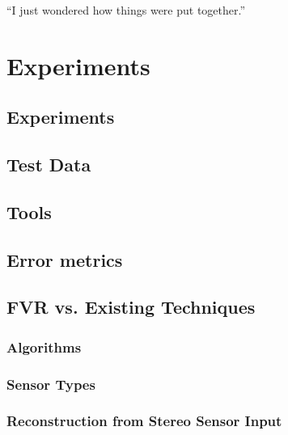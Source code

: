 \begin{savequote}[8cm]
  ``I just wondered how things were put together.''
\end{savequote}
\makeatletter
\chapter{Experiments}
\label{ch:Experiments}

\section{Experiments}



\section{Test Data}
\label{TestDataSection}


\section{Tools}
\label{ToolsSection}


\section{Error metrics}
\label{metricsSection}


\section{FVR vs. Existing Techniques}
\label{Sec:FVRSOTA}
\subsection{Algorithms} 
\label{AlgorithmsSection}


\subsection{Sensor Types} 
\label{SensorTypesExpsSection}


\subsection{Reconstruction from Stereo Sensor Input}
\label{StereoSOTA}


